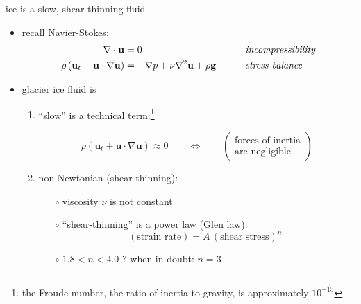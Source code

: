 \documentclass[hide notes,intlimits]{beamer}
\begin{document}
\begin{frame}{ice is a slow, shear-thinning fluid}

\begin{itemize}
\item recall Navier-Stokes:
\small
\begin{align*}
\nabla \cdot \mathbf{u} &= 0 &&\qquad \text{\emph{incompressibility}} \\
\rho \left(\mathbf{u}_t + \mathbf{u}\cdot\nabla \mathbf{u}\right) &= -\nabla p + \nu \nabla^2 \mathbf{u} + \rho \mathbf{g} &&\qquad \text{\emph{stress balance}}
\end{align*}
\normalsize
\item glacier ice fluid is
  \begin{enumerate}
  \item ``slow'' is a technical term:\footnote{the Froude number, the ratio of inertia to gravity, is approximately $10^{-15}$}

\vspace{-3mm}
    $$\rho \left(\mathbf{u}_t + \mathbf{u}\cdot\nabla \mathbf{u}\right) \approx 0 \qquad \iff \qquad \begin{pmatrix} \text{forces of inertia} \\ \text{are negligible} \end{pmatrix}$$
  \item non-Newtonian (shear-thinning):

    \begin{itemize}
    \item[$\circ$] viscosity $\nu$ is not constant
    \item[$\circ$] ``shear-thinning'' is a power law (Glen law):
        $$(\text{strain rate}) = A\, (\text{shear stress})^n$$
    \item[$\circ$] $1.8 < n < 4.0$ ?  \quad when in doubt: \alert{$n=3$}
    \end{itemize}
  \end{enumerate}
\end{itemize}
\end{frame}
\end{document}
